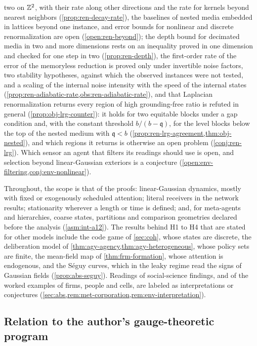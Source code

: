 two on $\mathbb{Z}^2$, with their rate along other directions and the rate for kernels beyond nearest neighbors (\cref{prop:ren-decay-rate}), the baselines of nested media embedded in lattices beyond one instance, and error bounds for nonlinear and discrete renormalization are open (\cref{open:ren-beyond}); the depth bound for decimated media in two and more dimensions rests on an inequality proved in one dimension and checked for one step in two (\cref{prop:ren-depth}), the first-order rate of the error of the memoryless reduction is proved only under invertible noise factors, two stability hypotheses, against which the observed instances were not tested, and a scaling of the internal noise intensity with the speed of the internal states (\cref{prop:ren-adiabatic-rate,obs:ren-adiabatic-rate}), and that Laplacian renormalization returns every region of high grounding-free ratio is refuted in general (\cref{prop:obj-lrg-counter}): it holds for two equitable blocks under a gap condition and, with the constant threshold $b/(b-\mathfrak q)$, for the level blocks below the top of the nested medium with $\mathfrak q<b$ (\cref{prop:ren-lrg-agreement,thm:obj-nested}), and which regions it returns is otherwise an open problem (\cref{conj:ren-lrg}). Which sensor an agent that filters its readings should use is open, and selection beyond linear-Gaussian exteriors is a conjecture (\cref{open:env-filtering,conj:env-nonlinear}).

Throughout, the scope is that of the proofs: linear-Gaussian dynamics, mostly with fixed or exogenously scheduled attention; literal receivers in the network results; stationarity wherever a length or time is defined; and, for meta-agents and hierarchies, coarse states, partitions and comparison geometries declared before the analysis (\cref{asm:int-a12}). The results behind H1 to H4 that are stated for other models include the code game of \cref{sec:coh}, whose states are discrete, the deliberation model of \cref{thm:agy-agency,thm:agy-heterogeneous}, whose policy sets are finite, the mean-field map of \cref{thm:frm-formation}, whose attention is endogenous, and the S\'eguy curves, which in the leaky regime read the signs of Gaussian fields (\cref{prop:abs-seguy}). Readings of social-science findings, and of the worked examples of firms, people and cells, are labeled as interpretations or conjectures (\cref{sec:abs,rem:met-corporation,rem:env-interpretation}).

\subsection{Relation to the author's gauge-theoretic program}\label{sec:int-gauge}

